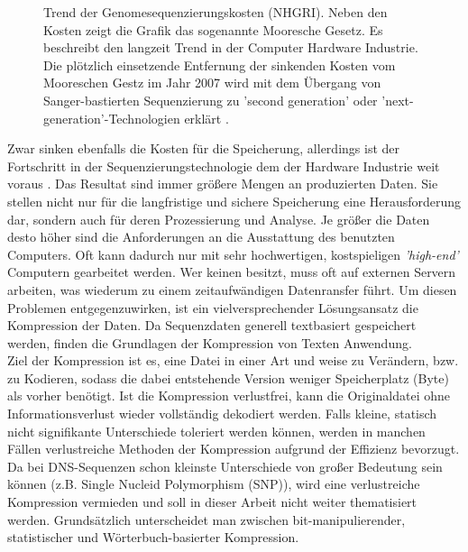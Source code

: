\documentclass[12pt]{article}
\begin{document}
\begin{figure}[hb!]
\caption{\label{fig:costs}Trend der Genomesequenzierungskosten (NHGRI). Neben den Kosten zeigt die Grafik das sogenannte Mooresche Gesetz. Es beschreibt den langzeit Trend in der Computer Hardware Industrie. Die plötzlich einsetzende Entfernung der sinkenden Kosten vom Mooreschen Gestz im Jahr 2007 wird mit dem Übergang von Sanger-bastierten Sequenzierung zu 'second generation' oder 'next-generation'-Technologien erklärt \cite{sequencingCosts}.}
\end{figure}

Zwar sinken ebenfalls die Kosten für die Speicherung, allerdings ist der Fortschritt in der Sequenzierungstechnologie dem der Hardware Industrie weit voraus \cite{sequencingCosts}.  Das Resultat sind immer größere Mengen an produzierten Daten. Sie stellen nicht nur für die langfristige und sichere Speicherung eine Herausforderung dar, sondern auch für deren Prozessierung und Analyse. Je größer die Daten desto höher sind die Anforderungen an die Ausstattung des benutzten Computers. Oft kann dadurch nur mit sehr hochwertigen, kostspieligen \textit{'high-end'} Computern gearbeitet werden. Wer keinen besitzt, muss oft auf externen Servern arbeiten, was wiederum zu einem zeitaufwändigen Datenransfer führt.
Um diesen Problemen entgegenzuwirken, ist ein vielversprechender Lösungsansatz die Kompression der Daten. Da Sequenzdaten generell textbasiert gespeichert werden, finden die Grundlagen der Kompression von Texten Anwendung. \\

Ziel der Kompression ist es, eine Datei in einer Art und weise zu Verändern, bzw. zu Kodieren, sodass die dabei entstehende Version weniger Speicherplatz (Byte) als vorher benötigt. Ist die Kompression verlustfrei, kann die Originaldatei ohne Informationsverlust wieder vollständig dekodiert werden. Falls kleine, statisch nicht signifikante Unterschiede toleriert werden können, werden in manchen Fällen verlustreiche Methoden der Kompression aufgrund der Effizienz bevorzugt. Da bei DNS-Sequenzen schon kleinste Unterschiede von großer Bedeutung sein können (z.B. Single Nucleid Polymorphism (SNP)), wird eine verlustreiche Kompression vermieden und soll in dieser Arbeit nicht weiter thematisiert werden. Grundsätzlich unterscheidet man zwischen bit-manipulierender, statistischer und Wörterbuch-basierter Kompression.
\end{document}
